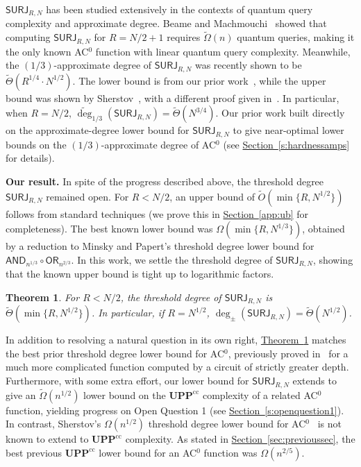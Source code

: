 \documentclass[11pt]{article}
\numberwithin{equation}{section}
\newtheorem{theorem}{Theorem}[section]
\theoremstyle{definition}
\theoremstyle{plain}
\newcommand{\expref}[2]{\hyperref[#2]{#1~\ref{#2}}}
\newcommand{\SURJ}{\mathsf{ SURJ}}
\newcommand{\OR}{\mathsf{ OR}}
\newcommand{\UPP}{\mathbf{UPP}}
\newcommand{\adeg}{\widetilde{\operatorname{deg}}}
\newcommand{\AND}{\mathsf{AND}}
\begin{document}
$\SURJ_{R, N}$ has been studied extensively in the contexts of quantum query complexity and approximate degree. Beame and Machmouchi~\cite{beame} showed that computing $\SURJ_{R, N}$ for $R = N/2 + 1$ requires $\tilde{\Omega}(n)$ quantum queries, making it the only known AC$^0$ function with  linear quantum query complexity. Meanwhile,
the $(1/3)$-approximate degree of $\SURJ_{R, N}$ was recently shown to be $\tilde{\Theta}(R^{1/4} \cdot N^{1/2})$. The lower
bound is from our prior work~\cite{bkt}, while the upper bound
was shown by Sherstov~\cite{algopoly}, with a different proof given in~\cite{bkt}. 
In particular, when $R=N/2$, $\adeg_{1/3}(\SURJ_{R, N}) = \tilde{\Theta}(N^{3/4})$. 
Our prior %
work  %
\cite{adegsurj, bkt} built directly on the
%
approximate-degree %
lower bound for $\SURJ_{R, N}$ to 
give near-optimal lower bounds on the $(1/3)$-approximate degree of AC$^0$ (see \expref{Section}{s:hardnessamps} for details).

\medskip \noindent \textbf{Our result.} 
In spite of the progress described above, the  threshold degree $\SURJ_{R, N}$
remained open. For $R < N/2$, an upper bound of $\tilde{O}(\min\{R, N^{1/2}\})$ follows from standard techniques (we prove
this in \expref{Section}{app:ub} for completeness). The best known lower bound was $\Omega(\min\{R, N^{1/3}\})$, obtained by a reduction
to Minsky and Papert's threshold degree lower bound for $\AND_{n^{1/3}} \circ \OR_{n^{2/3}}$.
In this work, we settle the threshold degree of $\SURJ_{R, N}$, showing that the known upper bound is tight up to logarithmic
factors.


\begin{theorem} \label{thm:surj}
	For $R < N/2$, the threshold degree of $\SURJ_{R, N}$ is
	$\tilde{\Theta}(\min\{R, N^{1/2}\})$. In particular, if $R=N^{1/2}$, $\deg_{\pm}(\SURJ_{R, N}) = \tilde{\Theta}(N^{1/2})$. 
\end{theorem}


In addition to  
resolving a natural question in its own right, \expref{Theorem}{thm:surj} matches the best prior threshold degree lower bound for AC$^0$,
previously proved in~\cite{sherstov15} for a much more complicated  function computed by a circuit of strictly greater depth. 
Furthermore, with some extra effort, our lower bound for $\SURJ_{R, N}$ extends to give an $\tilde{\Omega}(n^{1/2})$ lower
bound on the $\UPP^{\text{cc}}$ complexity of a related AC$^0$ function, yielding progress on Open Question 1
%
(see \expref{Section}{s:openquestion1}).   %
In contrast, Sherstov's  $\Omega(n^{1/2})$ threshold degree lower bound
for AC$^0$~\cite{sherstov15} is not known to extend to $\UPP^{\text{cc}}$ complexity. As stated in \expref{Section}{sec:previoussec}, the best previous $\UPP^{\text{cc}}$ lower bound for an AC$^0$ function was $\Omega(n^{2/5})$.
\end{document}

